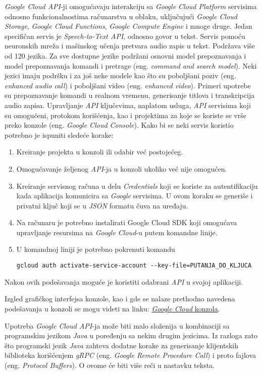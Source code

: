 \documentclass[android.tex]{subfiles}
\begin{document}
\textit{Google Cloud API}-ji omogućavaju interakciju sa \textit{Google Cloud Platform} servisima odnosno funkcionalnostima računarstva u oblaku, uključujući \textit{Google Cloud Storage}, \textit{Google Cloud Functions}, \textit{Google Compute Engine} i mnoge druge. Jedan specifičan servis je \textit{Speech-to-Text API}, odnosno govor u tekst. Servis pomoću neuronskih mreža i mašinskog učenja pretvara audio zapis u tekst. Podržava više od 120 jezika. Za sve dostupne jezike podržani osnovni model prepoznavanja i model prepoznavanja komandi i pretrage (eng. \textit{command and search model}). Neki jezici imaju podršku i za još neke modele kao što su poboljšani poziv (eng. \textit{enhanced audio call}) i poboljšani video (eng. \textit{enhanced video}). Primeri upotrebe su prepoznavanje komandi u realnom vremenu, generisanje titlova i transkripcija audio zapisa.   
Upravljanje \textit{API} ključevima, naplatom usluga, \textit{API} servisima koji su omogućeni, protokom korišćenja, kao i projektima za koje se koriste se vrše preko konzole (eng. \textit{Google Cloud Console}). Kako bi se neki servis koristio potrebno je ispuniti sledeće korake: 
\begin{enumerate}
    \item Kreiranje projekta u konzoli ili odabir već postojećeg.
    \item Omogućavanje željenog \textit{API}-ja u konzoli ukoliko već nije omogućen. 
    \item Kreiranje servisnog računa u delu \textit{Credentials} koji se koriste za autentifikaciju kada aplikacija komunicira sa \textit{Google} servisima. U ovom koraku se generiše i privatni ključ koji se u \textit{JSON} formatu čuva na uređaju.
    \item Na računaru je potrebno instalirati Google Cloud SDK koji omogućava upravljanje resursima na \textit{Google Cloud}-u putem komandne linije.
    \item U komandnoj liniji je potrebno pokrenuti komandu
    
    \verb|gcloud auth activate-service-account --key-file=PUTANJA_DO_KLJUCA|
\end{enumerate}
Nakon ovih podešavanja moguće je koristiti odabrani \textit{API} u svojoj aplikaciji.

Izgled grafičkog interfejsa  konzole, kao i gde se nalaze prethodno navedena podešavanja u konzoli se mogu videti na linku:
\hyperlink{https://cloud.google.com/speech-to-text/docs/ui-overview}{\textit{Google Cloud} konzola}.

Upotreba \textit{Google Cloud API}-ja može biti malo složenija u kombinaciji sa programskim jezikom \textit{Java} u poređenju sa nekim drugim jezicima. Iz razloga zato što programski jezik \textit{Java} zahteva dodatne korake za generisanje klijentskih biblioteka korišćenjem \textit{gRPC} (eng. \textit{Google Remote Procedure Call}) i proto fajlova (eng. \textit{Protocol Buffers}). O ovome će biti više reči u nastavku teksta.
\end{document}
